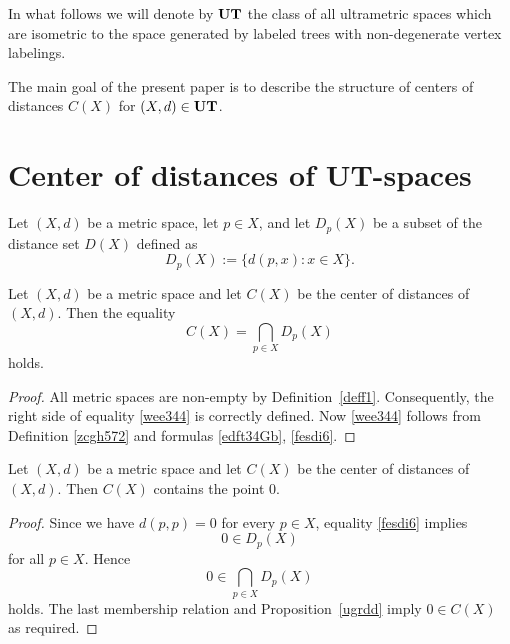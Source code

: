 \documentclass{article}
\begin{document}
In what follows we will denote by ${\bf UT}$ the class of all ultrametric spaces
which are isometric to the space generated by labeled trees 
with non-degenerate vertex labelings.

The main goal of the present paper is to describe the structure of centers of distances
$C(X)$ for $(X,d) \in {\bf UT}$.






\section{Center of distances of UT-spaces}\label{sec3}



Let $(X,d)$ be a metric space,  let $p \in X$, and  
let $D_p(X)$ be a subset of 
the distance set $D(X)$
 defined as
\begin{equation}
    \label{fesdi6}
D_p(X) := \{ d(p,x) : x \in X \}. 
\end{equation}



\begin{Proposition}\label{ugrdd}
Let $(X,d)$ be a metric space and let $C(X)$ be the center of distances of $(X,d)$. Then the equality 
\begin{equation}
    \label{wee344}
C(X) = \bigcap_{p \in X} D_p(X) 
\end{equation}
holds.
\end{Proposition}

\begin{proof}
All metric spaces are non-empty by Definition~\ref{deff1}.
Consequently, the right side of equality \eqref{wee344} is correctly defined.
Now \eqref{wee344} follows from Definition \ref{zcgh572} and formulas \eqref{edft34Gb},  \eqref{fesdi6}. 
\end{proof}




\begin{Proposition}\label{xxxy} Let $(X,d)$ be a metric space and let $C(X)$ be the center of distances of $(X,d)$.
Then  $C(X)$ contains the point $0$.
\end{Proposition}


\begin{proof}
Since we have $d(p,p)=0$ for every $p \in X$, equality \eqref{fesdi6} implies
\[
0 \in D_p(X)
\]
for all $p \in X$.
Hence
\begin{equation*}
0 \in \bigcap_{p \in X} D_p(X)
\end{equation*}
holds. The last membership relation and Proposition~\ref{ugrdd} imply
\(
    0\in C(X)
\)
as required.
\end{proof} 
\end{document}
